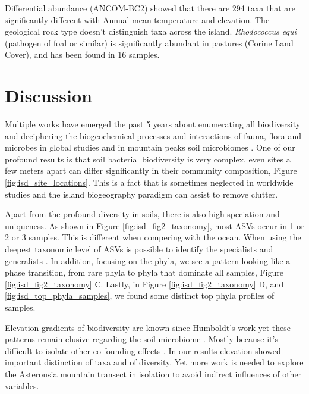 Differential abundance (ANCOM-BC2) showed that there are 294 taxa that are significantly different
with Annual mean temperature and elevation. The geological rock type doesn't distinguish taxa
across the island. \textit{Rhodococcus equi} (pathogen of foal or similar) is significantly abundant in
pastures (Corine Land Cover), and has been found in 16 samples.

\section{Discussion}\label{integration_discussion}

Multiple works have emerged the past 5 years about enumerating all
biodiversity \parencite{Anthony2023} and deciphering the biogeochemical 
processes and interactions of fauna, flora and microbes in global
studies \parencite{Fry2019, Crowther2019,GRANDY201640,Delgado-Baquerizo2020} and
in mountain peaks soil microbiomes \parencite{Adamczyk2019}. One of our profound
results is that soil bacterial biodiversity is very complex, even sites a few meters apart can differ
significantly in their community composition, Figure \ref{fig:isd_site_locations}.
This is a fact that is sometimes neglected in worldwide studies and the island biogeography
paradigm can assist to remove clutter.

Apart from the profound diversity in soils, there is also high speciation and uniqueness. 
As shown in Figure \ref{fig:isd_fig2_taxonomy}, most ASVs occur in 1 or 2 or 3 samples.
This is different when compering with the ocean. When using the deepest taxonomic
level of ASVs is possible to identify the specialists and generalists \parencite{Barberan2012}. 
In addition, focusing on the phyla, we see a pattern looking like a phase transition, from 
rare phyla to phyla that dominate all samples, Figure \ref{fig:isd_fig2_taxonomy} C. Lastly, in Figure \ref{fig:isd_fig2_taxonomy} D,
and \ref{fig:isd_top_phyla_samples}, we found some distinct top phyla profiles of samples.

Elevation gradients of biodiversity are known since Humboldt's work \parencite{Rahbek2019} 
yet these patterns remain elusive regarding the soil microbiome \parencite{Looby2020, Siles2023}.
Mostly because it's difficult to isolate other co-founding effects \parencite{Nottingham2018}.
In our results elevation showed important distinction of taxa and of diversity. Yet more work is 
needed to explore the Asterousia mountain transect in isolation to avoid indirect influences of 
other variables.

